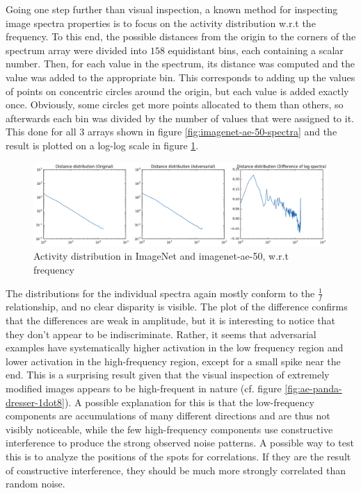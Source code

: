 \documentclass[11pt, a4paper]{article}
\begin{document}
Going one step further than visual inspection, a known method for inspecting image spectra properties is to focus on the activity distribution w.r.t the frequency. To this end, the possible distances from the origin to the corners of the spectrum array were divided into $158$ equidistant bins, each containing a scalar number. Then, for each value in the spectrum, its distance was computed and the value was added to the appropriate bin. This corresponds to adding up the values of points on concentric circles around the origin, but each value is added exactly once. Obviously, some circles get more points allocated to them than others, so afterwards each bin was divided by the number of values that were assigned to it. This done for all 3 arrays shown in figure \ref{fig:imagenet-ae-50-spectra} and the result is plotted on a log-log scale in figure \ref{fig:imagenet-ae-50-frequency}.

\begin{figure}[htb]
	\centering
	\includegraphics[width=\textwidth]{images/spectra/imagenet-ae-50-minconfidence-0dot5-maxorig-20000-distance-158-bins.png}
	\caption{Activity distribution in ImageNet and imagenet-ae-50, w.r.t frequency}
	\label{fig:imagenet-ae-50-frequency}
\end{figure}

The distributions for the individual spectra again mostly conform to the $\frac{1}{f}$ relationship, and no clear disparity is visible. The plot of the difference confirms that the differences are weak in amplitude, but it is interesting to notice that they don't appear to be indiscriminate. Rather, it seems that adversarial examples have systematically higher activation in the low frequency region and lower activation in the high-frequency region, except for a small spike near the end. This is a surprising result given that the visual inspection of extremely modified images appears to be high-frequent in nature (cf. figure \ref{fig:ae-panda-dresser-1dot8}). A possible explanation for this is that the low-frequency components are accumulations of many different directions and are thus not visibly noticeable, while the few high-frequency components use constructive interference to produce the strong observed noise patterns. A possible way to test this is to analyze the positions of the spots for correlations. If they are the result of constructive interference, they should be much more strongly correlated than random noise.
\end{document}
